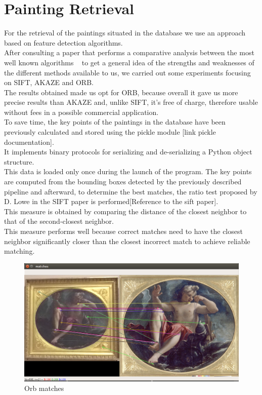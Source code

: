 \documentclass[conference]{IEEEtran}
\begin{document}
\section{Painting Retrieval}
For the retrieval of the paintings situated in the database we use an approach based on feature detection algorithms.\\ 
After consulting a paper that performs a comparative analysis between the most well known algorithms ~\cite{b1} to get a general idea of the strengths and weaknesses of the different methods available to us, we carried out some experiments focusing on SIFT, AKAZE and ORB.\\
The results obtained made us opt for ORB, because overall it gave us more precise results than AKAZE and, unlike SIFT, it’s free of charge, therefore usable without fees in a possible commercial application.\\
To save time, the key points of the paintings in the database have been previously calculated and stored using the pickle module [link pickle documentation].\\
It implements binary protocols for serializing and de-serializing a Python object structure.\\
This data is loaded only once during the launch of the program.
The key points are computed from the bounding boxes detected by the previously described pipeline and afterward, to determine the best matches, the ratio test proposed by D. Lowe in the SIFT paper is performed[Reference to the sift paper].\\
This measure is obtained by comparing the distance of the closest neighbor to that of the second-closest neighbor.\\
This measure performs well because correct matches need to have the closest neighbor significantly closer than the closest incorrect match to achieve reliable matching.\\

\begin{figure}[htbp]
\centerline{\includegraphics[width=0.8\columnwidth]{../Orb_matches/match3.png}}
\caption{Orb matches}
\label{fig_Orb_matches}
\end{figure}
\bigskip
\end{document}
